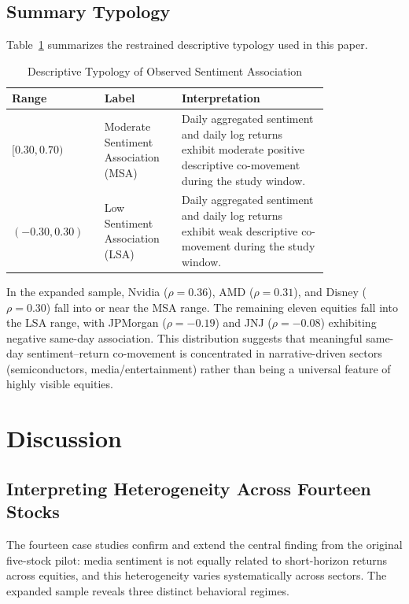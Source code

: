 \documentclass[lettersize,journal]{IEEEtran}
\begin{document}
\subsection{Summary Typology}
Table~\ref{tab:typology_main2} summarizes the restrained descriptive typology used in this paper.

\begin{table}[!htbp]
\centering
\caption{Descriptive Typology of Observed Sentiment Association}
\label{tab:typology_main2}
\begin{tabular}{|p{0.19\linewidth}|p{0.21\linewidth}|p{0.40\linewidth}|}
\hline
\textbf{Range} & \textbf{Label} & \textbf{Interpretation} \\
\hline
$[0.30, 0.70)$ & Moderate Sentiment Association (MSA) & Daily aggregated sentiment and daily log returns exhibit moderate positive descriptive co-movement during the study window. \\
\hline
$(-0.30, 0.30)$ & Low Sentiment Association (LSA) & Daily aggregated sentiment and daily log returns exhibit weak descriptive co-movement during the study window. \\
\hline
\end{tabular}
\end{table}

In the expanded sample, Nvidia ($\rho = 0.36$), AMD ($\rho = 0.31$), and Disney ($\rho = 0.30$) fall into or near the MSA range. The remaining eleven equities fall into the LSA range, with JPMorgan ($\rho = -0.19$) and JNJ ($\rho = -0.08$) exhibiting negative same-day association. This distribution suggests that meaningful same-day sentiment--return co-movement is concentrated in narrative-driven sectors (semiconductors, media/entertainment) rather than being a universal feature of highly visible equities.

\section{Discussion}
\label{sec:discussion}

\subsection{Interpreting Heterogeneity Across Fourteen Stocks}
The fourteen case studies confirm and extend the central finding from the original five-stock pilot: media sentiment is not equally related to short-horizon returns across equities, and this heterogeneity varies systematically across sectors. The expanded sample reveals three distinct behavioral regimes.
\end{document}
